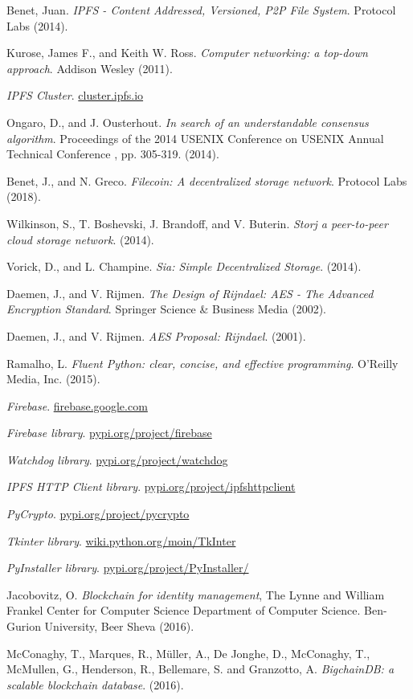\documentclass[12pt]{report}
\begin{document}
\begin{thebibliography}{9}
Benet, Juan. \textit{IPFS - Content Addressed, Versioned, P2P File System}. Protocol Labs (2014).

Kurose, James F., and Keith W. Ross. \textit{Computer networking: a top-down approach}. Addison Wesley (2011).

\textit{IPFS Cluster}. 
\url{cluster.ipfs.io}

Ongaro, D., and J. Ousterhout. \textit{In search of an understandable consensus algorithm}. Proceedings of the 2014 USENIX Conference on USENIX Annual Technical Conference , pp. 305-319. (2014).

Benet, J., and N. Greco. \textit{Filecoin: A decentralized storage network}. Protocol Labs (2018).

Wilkinson, S., T. Boshevski, J. Brandoff, and V. Buterin. \textit{Storj a peer-to-peer cloud storage network}. (2014).

Vorick, D., and L. Champine.
\textit{Sia: Simple Decentralized Storage}. (2014).

Daemen, J., and V. Rijmen.
\textit{The Design of Rijndael: AES - The Advanced Encryption Standard}. Springer Science \& Business Media (2002).

Daemen, J., and V. Rijmen.
\textit{AES Proposal: Rijndael}. (2001).

Ramalho, L.
\textit{Fluent Python: clear, concise, and effective programming}. O'Reilly Media, Inc. (2015).

\textit{Firebase}. 
\url{firebase.google.com}

\textit{Firebase library}. 
\url{pypi.org/project/firebase}

\textit{Watchdog library}. 
\url{pypi.org/project/watchdog}

\textit{IPFS HTTP Client library}. 
\url{pypi.org/project/ipfshttpclient}

\textit{PyCrypto}. 
\url{pypi.org/project/pycrypto}

\textit{Tkinter library}. 
\url{wiki.python.org/moin/TkInter}

\textit{PyInstaller library}. 
\url{pypi.org/project/PyInstaller/}

Jacobovitz, O.
\textit{Blockchain for identity management}, The Lynne and William Frankel Center for Computer Science Department of Computer Science. Ben-Gurion University, Beer Sheva (2016).

McConaghy, T., Marques, R., Müller, A., De Jonghe, D., McConaghy, T., McMullen, G., Henderson, R., Bellemare, S. and Granzotto, A. \textit{BigchainDB: a scalable blockchain database}. (2016).

\end{thebibliography}
\end{document}
